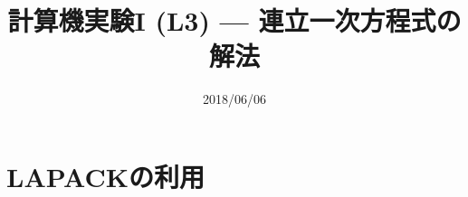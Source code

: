 \documentclass[dvipdfmx]{beamer}
\title{計算機実験I (L3) --- 連立一次方程式の解法}
\date{2018/06/06}
\begin{document}
\begin{frame}
  \titlepage
  \tableofcontents
\end{frame}



\section{LAPACKの利用}









\end{document}
